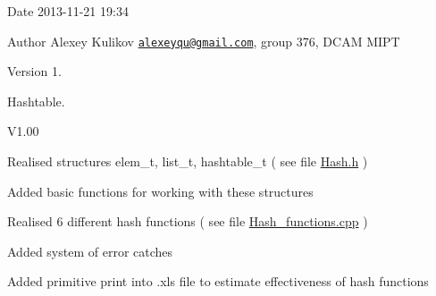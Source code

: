 \begin{DoxyDate}{Date}
2013-\/11-\/21 19\-:34 
\end{DoxyDate}
\begin{DoxyAuthor}{Author}
Alexey Kulikov \href{mailto:alexeyqu@gmail.com}{\tt alexeyqu@gmail.\-com}, group 376, D\-C\-A\-M M\-I\-P\-T 
\end{DoxyAuthor}
\begin{DoxyVersion}{Version}
1.
\end{DoxyVersion}
Hashtable.

\begin{DoxyParagraph}{V1.00}

\begin{DoxyItemize}
\item Realised structures elem\-\_\-t, list\-\_\-t, hashtable\-\_\-t ( see file \hyperlink{Hash_8h}{Hash.\-h} )
\item Added basic functions for working with these structures
\item Realised 6 different hash functions ( see file \hyperlink{Hash__functions_8cpp}{Hash\-\_\-functions.\-cpp} )
\item Added system of error catches
\item Added primitive print into .xls file to estimate effectiveness of hash functions 
\end{DoxyItemize}
\end{DoxyParagraph}
